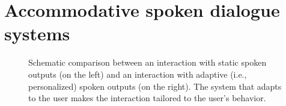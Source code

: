 \section{Accommodative spoken dialogue systems}
\label{sec:adaptive_spoken_dialogue_systems}

\begin{figure}[t]
	\centering
	\hfill %
	\caption[Static vs.\ adaptive speech output]
		{Schematic comparison between an interaction with static spoken outputs (on the left) and an interaction with adaptive (i.e., personalized) spoken outputs (on the right).
		The system that adapts to the user makes the interaction tailored to the user's behavior.}
	\label{fig:static_vs_adaptive_speech_output}
\end{figure}

